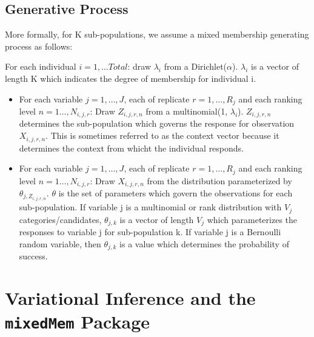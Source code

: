 \documentclass{article}\usepackage[]{graphicx}\usepackage[]{color}
\begin{document}
\subsection{Generative Process}\label{generative}
More formally, for K sub-populations, we assume a mixed membership generating process as follows:

\noindent
For each individual $i = 1,\ldots Total$: draw $\lambda_i$ from a Dirichlet($\alpha$). $\lambda_i$ is a vector of length K which indicates the degree of membership for individual i.
  \begin{itemize}
  \item For each variable $j = 1, \ldots, J$, each of replicate $r = 1, \dots, R_j$ and each ranking level $n = 1\ldots, N_{i,j,r}$: Draw $Z_{i,j,r,n}$ from a multinomial(1, $\lambda_i$). $Z_{i,j,r,n}$ determines the sub-population which governs the response for observation $X_{i,j,r,n}$. This is sometimes referred to as the context vector because it determines the context from whicht the individual responds.
  \item For each variable $j = 1, \ldots, J$, each of replicate $r = 1, \dots, R_j$ and each ranking level $n = 1\ldots, N_{i,j,r}$: Draw $X_{i,j,r,n}$ from the distribution parameterized by $\theta_{j,Z_{i,j,r,n}}$. $\theta$ is the set of parameters which govern the observations for each sub-population. If variable j is a multinomial or rank distribution with $V_j$ categories/candidates, $\theta_{j,k}$ is a vector of length $V_j$ which parameterizes the responses to variable j for sub-population k. If variable j is a Bernoulli random variable, then $\theta_{j,k}$ is a value which determines the probability of success. 
  \end{itemize}

\section{Variational Inference and the \texttt{mixedMem} Package}\label{VA}
\end{document}
